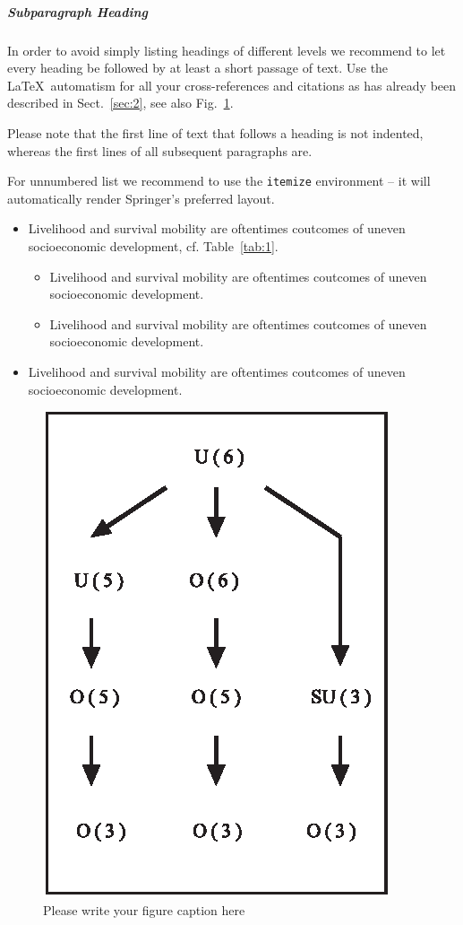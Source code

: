 \subparagraph{Subparagraph Heading} In order to avoid simply listing headings of different levels we recommend to let every heading be followed by at least a short passage of text. Use the \LaTeX\ automatism for all your cross-references and citations as has already been described in Sect.~\ref{sec:2}, see also Fig.~\ref{fig:2}.

Please note that the first line of text that follows a heading is not indented, whereas the first lines of all subsequent paragraphs are.

For unnumbered list we recommend to use the \verb|itemize| environment -- it will automatically render Springer's preferred layout.

\begin{itemize}
\item{Livelihood and survival mobility are oftentimes coutcomes of uneven socioeconomic development, cf. Table~\ref{tab:1}.}
\begin{itemize}
\item{Livelihood and survival mobility are oftentimes coutcomes of uneven socioeconomic development.}
\item{Livelihood and survival mobility are oftentimes coutcomes of uneven socioeconomic development.}
\end{itemize}
\item{Livelihood and survival mobility are oftentimes coutcomes of uneven socioeconomic development.}
\end{itemize}

\begin{figure}[t]
\sidecaption[t]
\includegraphics[scale=.65]{figure}
%
%
\caption{Please write your figure caption here}
\label{fig:2}       %
\end{figure}

